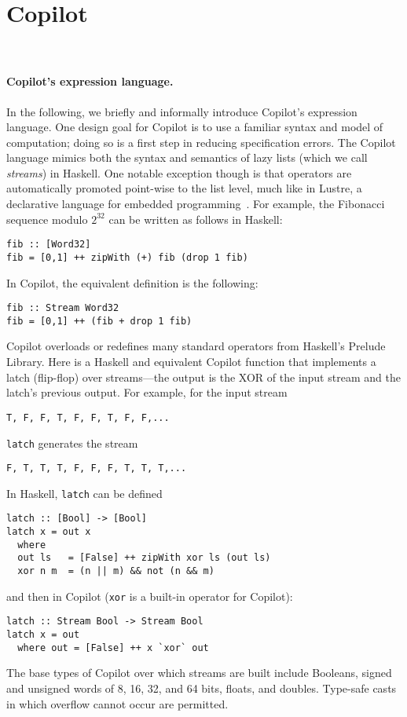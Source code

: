 \section{Copilot}~\label{sec:co-intro} 


\paragraph{Copilot's expression language.}
In the following, we briefly and informally introduce Copilot's expression
language.  One design goal for Copilot is to use a familiar syntax and model of
computation; doing so is a first step in reducing specification errors.  The
Copilot language mimics both the syntax and semantics of lazy lists (which we
call \emph{streams}) in Haskell.  One notable exception though is that
operators are automatically promoted point-wise to the list level, much like in
Lustre, a declarative language for embedded programming~\cite{lustre}.  For
example, the Fibonacci sequence modulo $2^{32}$ can be written as follows in Haskell:
%
\begin{lstlisting}[frame=single]
fib :: [Word32]
fib = [0,1] ++ zipWith (+) fib (drop 1 fib)
\end{lstlisting}
%
In Copilot, the equivalent definition is the following:
\begin{lstlisting}[frame=single]
fib :: Stream Word32
fib = [0,1] ++ (fib + drop 1 fib)
\end{lstlisting}
%
Copilot overloads or redefines many standard operators from Haskell's Prelude
Library.  Here is a Haskell and equivalent Copilot function that implements a
latch (flip-flop) over streams---the output is the XOR of the input stream and
the latch's previous output.  For example, for the input stream
%
\begin{lstlisting}
T, F, F, T, F, F, T, F, F,...
\end{lstlisting}
%
{\tt latch} generates the stream
\begin{lstlisting}
F, T, T, T, F, F, F, T, T, T,...
\end{lstlisting}
%
In Haskell, {\tt latch} can be defined
\begin{lstlisting}[frame=single]
latch :: [Bool] -> [Bool]
latch x = out x
  where
  out ls   = [False] ++ zipWith xor ls (out ls)
  xor n m  = (n || m) && not (n && m)
\end{lstlisting}
%
and then in Copilot ({\tt xor} is a built-in operator for Copilot):
%
\begin{lstlisting}[frame=single]
latch :: Stream Bool -> Stream Bool
latch x = out
  where out = [False] ++ x `xor` out
\end{lstlisting}
%
The base types of Copilot over which streams are built include Booleans, signed
and unsigned words of 8, 16, 32, and 64 bits, floats, and doubles. Type-safe
casts in which overflow cannot occur are permitted.

